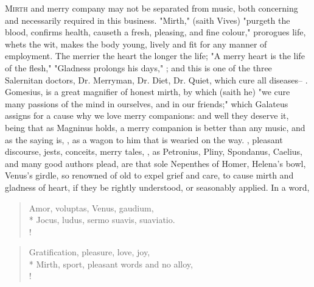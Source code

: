 {\lettrine{M}{irth} and merry company may not be separated from music, both concerning and necessarily required in this business. "Mirth," (saith Vives) "purgeth the blood, confirms health, causeth a fresh, pleasing, and fine colour," prorogues life, whets the wit, makes the body young, lively and fit for any manner of employment. The merrier the heart the longer the life; "A merry heart is the life of the flesh,"  "Gladness prolongs his days," ; and this is one of the three Salernitan doctors, Dr. Merryman, Dr. Diet, Dr. Quiet, which cure all diseases-- . Gomesius,  is a great magnifier of honest mirth, by which (saith he) "we cure many passions of the mind in ourselves, and in our friends;" which Galateus assigns for a cause why we love merry companions: and well they deserve it, being that as Magninus holds, a merry companion is better than any music, and as the saying is, , as a wagon to him that is wearied on the way. , pleasant discourse, jests, conceits, merry tales, , as Petronius, Pliny, Spondanus, Caelius, and many good authors plead, are that sole Nepenthes of Homer, Helena's bowl, Venus's girdle, so renowned of old to expel grief and care, to cause mirth and gladness of heart, if they be rightly understood, or seasonably applied. In a word,

\begin{latin}
\begin{verse}%
Amor, voluptas, Venus, gaudium,\\*
Jocus, ludus, sermo suavis, suaviatio.\\!
\end{verse}%
\end{latin}
\translationrule%
\begin{verse}%
Gratification, pleasure, love, joy,\\*
Mirth, sport, pleasant words and no alloy,\\!
\end{verse}%

}
